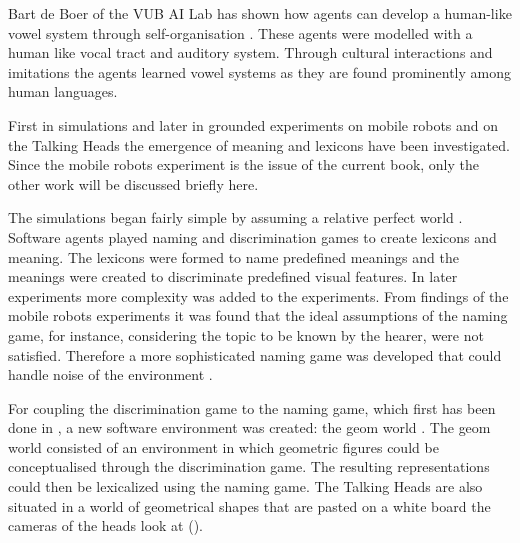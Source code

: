 Bart de Boer of the VUB AI Lab has shown how agents can develop a human-like vowel system through self-organisation \citep{deboer:1997,deboer:1999}. These agents were modelled with a human like vocal tract and auditory system. Through cultural interactions and imitations the agents learned vowel systems as they are found prominently among human languages. 


First in simulations \citep{steels:1996a,steels:1996b} and later in grounded experiments on mobile robots \citep{steelsvogt:1997,vogt:1998a,vogt:1998b,dejongvogt:1998} and on the Talking Heads \citep{belpaeme:1998,kaplan:2000,steels:2000} the emergence of meaning and lexicons have been investigated. Since the mobile robots experiment is the issue of the current book, only the other work will be discussed briefly here. 

The simulations began fairly simple by assuming a relative perfect world \citep{steels:1996a,steels:1996b}. Software agents played naming and discrimination games to create lexicons and meaning. The lexicons were formed to name predefined meanings and the meanings were created to discriminate predefined visual features. In later experiments more complexity was added to the experiments. From findings of the mobile robots experiments \citep{vogt:1998a} it was found that the ideal assumptions of the naming game, for instance, considering the topic to be known by the hearer, were not satisfied. Therefore a more sophisticated naming game was developed that could handle noise of the environment \citep{steelskaplan:1998}. 

For coupling the discrimination game to the naming game, which first has been done in \citealt{steelsvogt:1997}, a new software environment was created: the {\sc geom} world \citep{steels:2000}. The {\sc geom} world consisted of an environment in which geometric figures could be conceptualised through the discrimination game. The resulting representations could then be lexicalized using the naming game. The Talking Heads are also situated in a world of geometrical shapes that are pasted on a white board the cameras of the heads look at ().

